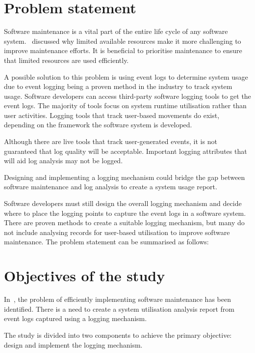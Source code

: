 \section{Problem statement}\label{sec:ch1_problemStatement}
Software maintenance is a vital part of the entire life cycle of any software system.~ discussed why limited available resources make it more challenging to improve maintenance efforts. It is beneficial to prioritise maintenance to ensure that limited resources are used efficiently. \par A possible solution to this problem is using event logs to determine system usage due to event logging being a proven method in the industry to track system usage. Software developers can access third-party software logging tools to get the event logs. The majority of tools focus on system runtime utilisation rather than user activities. Logging tools that track user-based movements do exist, depending on the framework the software system is developed. \par Although there are live tools that track user-generated events, it is not guaranteed that log quality will be acceptable. Important logging attributes that will aid log analysis may not be logged. \par Designing and implementing a logging mechanism could bridge the gap between software maintenance and log analysis to create a system usage report. \par Software developers must still design the overall logging mechanism and decide where to place the logging points to capture the event logs in a software system. There are proven methods to create a suitable logging mechanism, but many do not include analysing records for user-based utilisation to improve software maintenance. The problem statement can be summarised as follows:

\begin{center}
	\begin{tcolorbox}[colback=lightgray, colframe=black, sharp corners=all, arc=4pt]
		\begin{minipage}{\textwidth}
			\RaggedRight\textit{\problemStatement}
		\end{minipage}
	\end{tcolorbox}
\end{center}

\clearpage

\section{Objectives of the study}\label{sec:ch1_objectives}
In~, the problem of efficiently implementing software maintenance has been identified. There is a need to create a system utilisation analysis report from event logs captured using a logging mechanism. \par The study is divided into two components to achieve the primary objective: design and implement the logging mechanism. 

